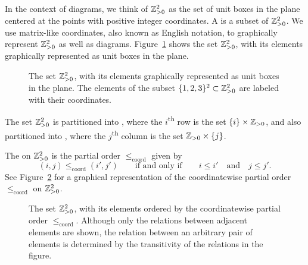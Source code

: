 In the context of diagrams,
we think of \(\mathbb{Z}_{> 0}^2\) as the set of unit boxes in the plane centered at the points with positive integer coordinates.
A  is a subset of \(\mathbb{Z}_{> 0}^2\).
We use matrix-like coordinates, also known as English notation, to graphically represent \(\mathbb{Z}_{> 0}^2\) as well as diagrams.
Figure~\ref{fig:positives2} shows the set \(\mathbb{Z}_{> 0}^2\), with its elements graphically represented as unit boxes in the plane.
\begin{figure}[htbp]
    \centering
    \caption{The set \(\mathbb{Z}_{> 0}^2\), with its elements graphically represented as unit boxes in the plane. The elements of the subset \(\interval{3}^2 \subset \positives^2\) are labeled with their coordinates.}
    \label{fig:positives2}
\end{figure}

The set \(\mathbb{Z}_{> 0}^2\) is partitioned into , where the \(i\)\textsuperscript{th} row is the set \(\{i\} \times \mathbb{Z}_{> 0}\),
and also partitioned into , where the \(j\)\textsuperscript{th} column is the set \(\mathbb{Z}_{> 0} \times \{j\}\).

\newcommand\coordleq{\leq_\mathrm{coord}}

The  on \(\mathbb{Z}_{> 0}^2\) is the partial order \(\coordleq\) given by
\begin{equation*}
    (i, j) \coordleq (i', j') \qquad \text{if and only if} \qquad i \leq i' \quad \text{and} \quad j \leq j'.
\end{equation*}
See Figure~\ref{fig:coordleq} for a graphical representation of the coordinatewise partial order \(\coordleq\) on \(\mathbb{Z}_{> 0}^2\).

\begin{figure}[htbp]
    \centering
    \caption{The set \(\mathbb{Z}_{> 0}^2\), with its elements ordered by the coordinatewise partial order \(\coordleq\).
        Although only the relations between adjacent elements are shown, the relation between an arbitrary pair of elements is determined by the transitivity of the relations in the figure.}
    \label{fig:coordleq}
\end{figure}

